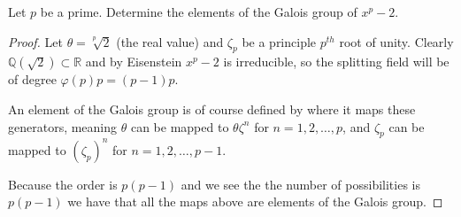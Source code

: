 \documentclass[11pt]{article}
\newenvironment{problem}[2][Problem\!]{\begin{tcolorbox}\begin{trivlist}
\item[\hskip \labelsep {\bfseries #1}\hskip \labelsep {\bfseries #2}]}{\end{trivlist}\end{tcolorbox}}
\newcommand{\qq}{\mathbb Q}   %
\newcommand{\rr}{\mathbb R}   %
\renewcommand{\phi}{\varphi}
\begin{document}
\vspace*{20pt}
\begin{problem}{14.2.4}
    Let $p$ be a prime. Determine the elements of the Galois group of $x^{p} - 2$.
\end{problem}
\begin{proof}
  Let $\theta = \sqrt[p]{2}$ (the real value) and $\zeta_p$ be a principle $p^{th}$ root of unity. Clearly $\qq(\sqrt{2}) \subset \rr$ and by Eisenstein $x^{p}-2$ is irreducible, so the splitting field will be of degree $\phi(p)p =(p-1)p $.

  An element of the Galois group is of course defined by where it maps these generators, meaning $\theta$ can be mapped to $\theta\zeta^{n}$ for $n = 1,2,\dots, p$, and $\zeta_p$ can be mapped to $(\zeta_p)^{n}$ for $n = 1,2, \dots, p-1$.
  
  Because the order is $p(p-1)$ and we see the the number of possibilities is $p(p-1)$ we have that all the maps above are elements of the Galois group. 
\end{proof}
\end{document}
